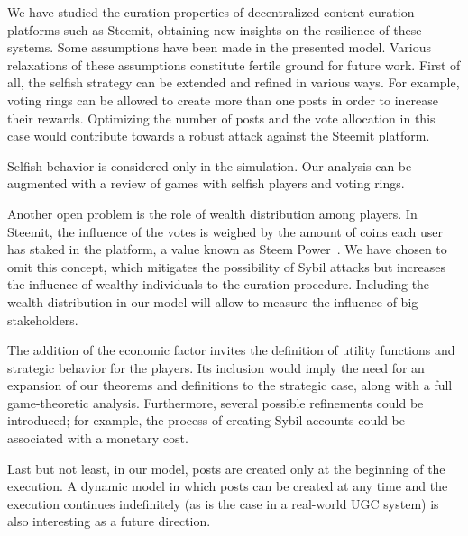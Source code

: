 
  We have studied the curation properties of decentralized content curation
  platforms such as Steemit, obtaining new insights on the resilience of these
  systems. Some assumptions have been made in the presented model. Various
  relaxations of these assumptions constitute fertile ground for future work.
  First of all, the selfish strategy can be extended and refined in various
  ways. For example, voting rings can be allowed to create more than one posts
  in order to increase their rewards. Optimizing the number of posts and the
  vote allocation in this case would contribute towards a robust attack against
  the Steemit platform.

  Selfish behavior is considered only in the simulation. Our analysis can be
  augmented with a review of games with selfish players and voting rings.

  Another open problem is the role of wealth distribution among players. In
  Steemit, the influence of the votes is weighed by the amount of coins each
  user has staked in the platform, a value known as Steem Power~\cite{steemit}.
  We have chosen to omit this concept, which mitigates the possibility of Sybil
  attacks but increases the influence of wealthy individuals to the curation
  procedure. Including the wealth distribution in our model will allow to
  measure the influence of big stakeholders. 

  The addition of the economic factor invites the definition of utility
  functions and strategic behavior for the players. Its inclusion would imply
  the need for an expansion of our theorems and definitions to the strategic
  case, along with a full game-theoretic analysis. Furthermore, several possible
  refinements could be introduced; for example, the process of creating Sybil
  accounts could be associated with a monetary cost.

  Last but not least, in our model, posts are created only at the beginning of
  the execution. A dynamic model in which posts can be created at any time and
  the execution continues indefinitely (as is the case in a real-world UGC
  system) is also interesting as a future direction.
